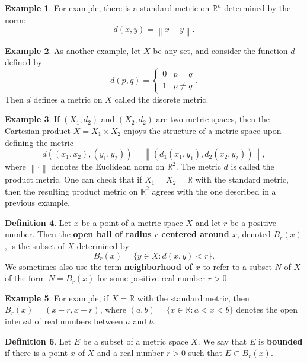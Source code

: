 \documentclass[12pt]{article}
\newcommand{\norm}[1]{\left\lVert#1\right\rVert}
\theoremstyle{definition}
\newtheorem{definition}{Definition}
\newtheorem{example}[definition]{Example}
\theoremstyle{theorem}
\begin{document}
\begin{example}
For example, there is a standard metric on $\mathbb{R}^n$ determined by the norm: 
\[
d(x,y) = \norm{x - y}.
\]
\end{example}

\begin{example}
As another example, let $X$ be any set, and consider the function $d$ defined by 
\[
d(p,q) = \begin{cases}
0 & p =q \\
1 & p \ne q
\end{cases}.
\]
Then $d$ defines a metric on $X$ called the discrete metric. 
\end{example}

\begin{example}
If $(X_1,d_2)$ and $(X_2,d_2)$ are two metric spaces, then the Cartesian product $X = X_1 \times X_2$ enjoys the structure of a metric space upon defining the metric 
\[
d((x_1, x_2), (y_1, y_2)) = \norm{\left(d_1(x_1, y_1), d_2(x_2, y_2)\right)},
\]
where $\norm{\cdot}$ denotes the Euclidean norm on $\mathbb{R}^2$. The metric $d$ is called the product metric. One can check that if $X_1 = X_2 = \mathbb{R}$ with the standard metric, then the resulting product metric on $\mathbb{R}^2$ agrees with the one described in a previous example. 
\end{example}



\begin{definition}
Let $x$ be a point of a metric space $X$ and let $r$ be a positive number. Then the \textbf{open ball of radius $r$ centered around $x$}, denoted $B_r(x)$, is the subset of $X$ determined by 
\[
B_r(x) = \{y \in X : d(x,y) < r\}.
\]
We sometimes also use the term \textbf{neighborhood of $x$} to refer to a subset $N$ of $X$ of the form $N = B_r(x)$ for some positive real number $r > 0$.  
\end{definition}

\begin{example}
For example, if $X = \mathbb{R}$ with the standard metric, then $B_r(x) = (x-r, x+r)$, where $(a,b) = \{x \in \mathbb{R} : a < x < b\}$ denotes the open interval of real numbers between $a$ and $b$. 
\end{example}

\begin{definition}
Let $E$ be a subset of a metric space $X$. We say that $E$ is \textbf{bounded} if there is a point $x$ of $X$ and a real number $r > 0$ such that $E \subset B_r(x)$. 
\end{definition}
\end{document}
